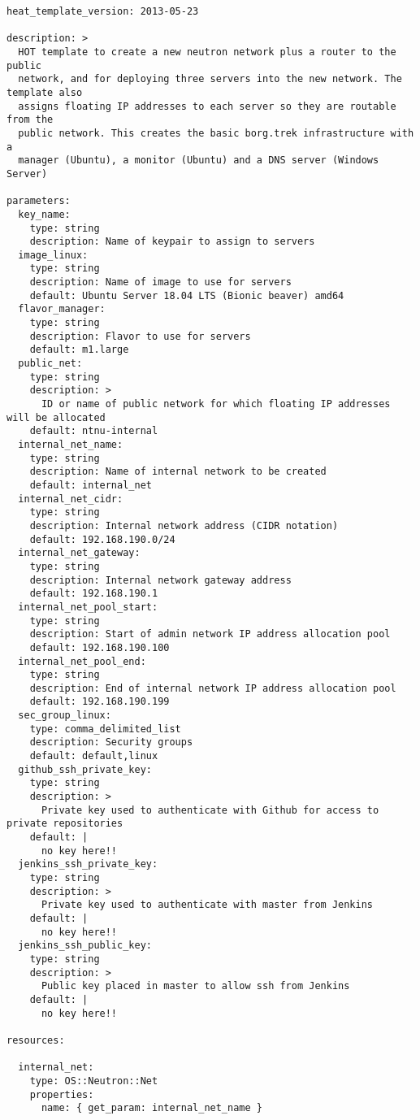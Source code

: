 \begin{verbatim}
heat_template_version: 2013-05-23

description: >
  HOT template to create a new neutron network plus a router to the public
  network, and for deploying three servers into the new network. The template also
  assigns floating IP addresses to each server so they are routable from the
  public network. This creates the basic borg.trek infrastructure with a 
  manager (Ubuntu), a monitor (Ubuntu) and a DNS server (Windows Server)

parameters:
  key_name:
    type: string
    description: Name of keypair to assign to servers
  image_linux:
    type: string
    description: Name of image to use for servers
    default: Ubuntu Server 18.04 LTS (Bionic beaver) amd64
  flavor_manager:
    type: string
    description: Flavor to use for servers
    default: m1.large
  public_net:
    type: string
    description: >
      ID or name of public network for which floating IP addresses will be allocated
    default: ntnu-internal
  internal_net_name:
    type: string
    description: Name of internal network to be created
    default: internal_net
  internal_net_cidr:
    type: string
    description: Internal network address (CIDR notation)
    default: 192.168.190.0/24
  internal_net_gateway:
    type: string
    description: Internal network gateway address
    default: 192.168.190.1
  internal_net_pool_start:
    type: string
    description: Start of admin network IP address allocation pool
    default: 192.168.190.100
  internal_net_pool_end:
    type: string
    description: End of internal network IP address allocation pool
    default: 192.168.190.199
  sec_group_linux:
    type: comma_delimited_list
    description: Security groups
    default: default,linux
  github_ssh_private_key:
    type: string
    description: >
      Private key used to authenticate with Github for access to private repositories
    default: |
      no key here!!
  jenkins_ssh_private_key:
    type: string
    description: >
      Private key used to authenticate with master from Jenkins
    default: |
      no key here!!
  jenkins_ssh_public_key:
    type: string
    description: >
      Public key placed in master to allow ssh from Jenkins
    default: |
      no key here!!

resources:

  internal_net:
    type: OS::Neutron::Net
    properties:
      name: { get_param: internal_net_name }


\end{verbatim}
